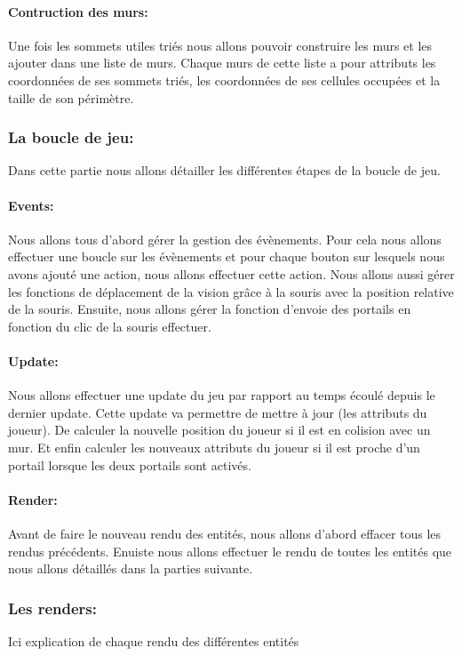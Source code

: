 \documentclass[12pt]{report}
\begin{document}
\paragraph{Contruction des murs:}
Une fois les sommets utiles triés nous allons pouvoir construire les murs et les ajouter dans une liste de murs. Chaque murs de cette liste a pour attributs les coordonnées de ses sommets triés, les coordonnées de ses cellules occupées et la taille de son périmètre.

\subsubsection{La boucle de jeu:}
Dans cette partie nous allons détailler les différentes étapes de la boucle de jeu.

\paragraph{Events:}
Nous allons tous d'abord gérer la gestion des évènements. Pour cela nous allons effectuer une boucle sur les évènements et pour chaque bouton sur lesquels nous avons ajouté une action, nous allons effectuer cette action. Nous allons aussi gérer les fonctions de déplacement de la vision grâce à la souris avec la position relative de la souris. Ensuite, nous allons gérer la fonction d'envoie des portails en fonction du clic de la souris effectuer.

\paragraph{Update:}
Nous allons effectuer une update du jeu par rapport au temps écoulé depuis le dernier update. Cette update va permettre de mettre à jour (les attributs du joueur). De calculer la nouvelle position du joueur si il est en colision avec un mur. Et enfin calculer les nouveaux attributs du joueur si il est proche d'un portail lorsque les deux portails sont activés.

\paragraph{Render:}
Avant de faire le nouveau rendu des entités, nous allons d'abord effacer tous les rendus précédents. Enuiste nous allons effectuer le rendu de toutes les entités que nous allons détaillés dans la parties suivante.

\subsubsection{Les renders:}
Ici explication de chaque rendu des différentes entités
\end{document}
